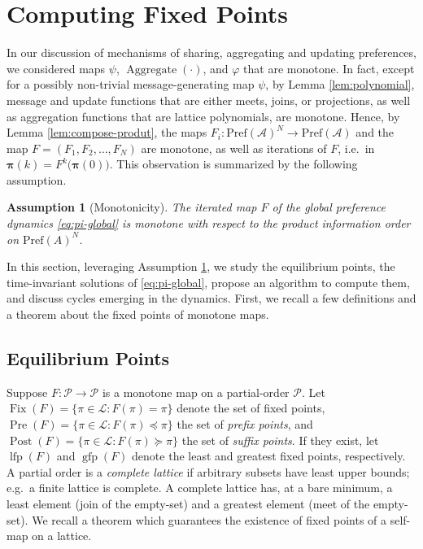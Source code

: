 \documentclass[conference]{ieeeconf}
\newcommand{\A}{\mathcal{A}}
\renewcommand{\P}{\mathcal{P}}
\newcommand{\Pref}{\mathrm{Pref}}
\renewcommand{\L}{\mathcal{L}}
\newcommand{\profile}{\boldsymbol{\pi}}
\DeclareMathOperator{\Fix}{Fix}
\DeclareMathOperator{\Pre}{Pre}
\DeclareMathOperator{\Post}{Post}
\DeclareMathOperator{\lfp}{lfp}
\DeclareMathOperator{\gfp}{gfp}
\DeclareMathOperator{\Aggregate}{Aggregate}
\newtheorem{assumption}{Assumption}
\begin{document}
\section{Computing Fixed Points}
\label{sec:fixed-points}

In our discussion of mechanisms of sharing, aggregating and updating preferences, we considered maps $\psi$, $\Aggregate(\cdot)$, and $\varphi$ that are monotone. In fact, except for a possibly non-trivial message-generating map $\psi$, by Lemma \ref{lem:polynomial}, message and update functions that are either meets, joins, or projections, as well as aggregation functions that are lattice polynomials, are monotone. Hence, by Lemma \ref{lem:compose-produt}, the maps $F_i: \Pref(\A)^N \to \Pref(\A)$ and the map $F = (F_1,F_2,\dots,F_N)$ are monotone, as well as iterations of $F$, i.e.~in $\profile(k) = F^k \bigl( \profile(0) \bigr)$. This observation is summarized by the following assumption.

\begin{assumption}[Monotonicity] \label{ass:monotone}
    The iterated map $F$ of the global preference dynamics \eqref{eq:pi-global} is monotone with respect to the product information order on $\Pref(A)^N$.
\end{assumption}

In this section, leveraging Assumption \ref{ass:monotone}, we study the equilibrium points, the time-invariant solutions of \eqref{eq:pi-global}, propose an algorithm to compute them, and discuss cycles emerging in the dynamics. First, we recall a few definitions and a theorem about the fixed points of monotone maps. 

\subsection{Equilibrium Points}

Suppose $F: \P \to \P$ is a monotone map on a partial-order $\P$. Let $\Fix(F) = \{ \pi \in \L: F(\pi) = \pi \}$ denote the set of fixed points, $\Pre(F) = \{ \pi \in \L : F(\pi) \preceq \pi\}$ the set of \emph{prefix points}, and $\Post(F) =\{ \pi \in \L : F(\pi) \succeq \pi\}$ the set of \emph{suffix points}. If they exist, let $\lfp(F)$ and $\gfp(F)$ denote the least and greatest fixed points, respectively. A partial order is a \emph{complete lattice} if arbitrary subsets have least upper bounds; e.g.~a finite lattice is complete. A complete lattice has, at a bare minimum, a least element (join of the empty-set) and a greatest element (meet of the empty-set). We recall a theorem which guarantees the existence of fixed points of a self-map on a lattice.
\end{document}
